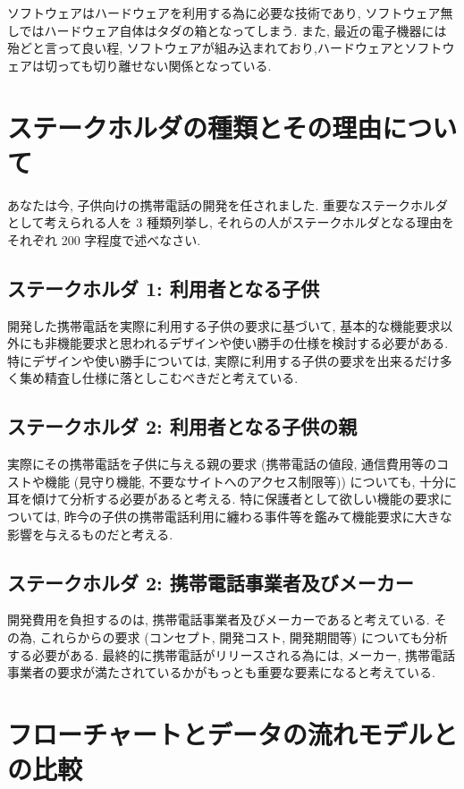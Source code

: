 \documentclass[a4paper]{jsarticle}
\begin{document}
ソフトウェアはハードウェアを利用する為に必要な技術であり, ソフトウェア無しではハードウェア自体はタダの箱となってしまう. また, 最近の電子機器には殆どと言って良い程, ソフトウェアが組み込まれており,ハードウェアとソフトウェアは切っても切り離せない関係となっている.

\section{ステークホルダの種類とその理由について}

あなたは今, 子供向けの携帯電話の開発を任されました. 重要なステークホルダとして考えられる人を 3 種類列挙し, それらの人がステークホルダとなる理由をそれぞれ 200 字程度で述べなさい.

\subsection{ステークホルダ 1: 利用者となる子供}

開発した携帯電話を実際に利用する子供の要求に基づいて, 基本的な機能要求以外にも非機能要求と思われるデザインや使い勝手の仕様を検討する必要がある.特にデザインや使い勝手については, 実際に利用する子供の要求を出来るだけ多く集め精査し仕様に落としこむべきだと考えている.

\subsection{ステークホルダ 2: 利用者となる子供の親}

実際にその携帯電話を子供に与える親の要求 (携帯電話の値段, 通信費用等のコストや機能 (見守り機能, 不要なサイトへのアクセス制限等)) についても, 十分に耳を傾けて分析する必要があると考える. 特に保護者として欲しい機能の要求については, 昨今の子供の携帯電話利用に纏わる事件等を鑑みて機能要求に大きな影響を与えるものだと考える. 

\subsection{ステークホルダ 2: 携帯電話事業者及びメーカー}

開発費用を負担するのは, 携帯電話事業者及びメーカーであると考えている. その為, これらからの要求 (コンセプト, 開発コスト, 開発期間等) についても分析する必要がある. 最終的に携帯電話がリリースされる為には, メーカー, 携帯電話事業者の要求が満たされているかがもっとも重要な要素になると考えている.

\section{フローチャートとデータの流れモデルとの比較}
\end{document}
